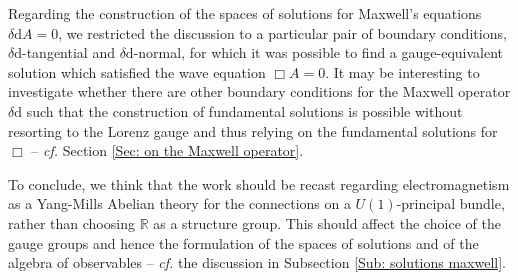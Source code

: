 Regarding the construction of the spaces of solutions for Maxwell's equations $\delta\mathrm{d}A=0$, we restricted the discussion to a particular pair of boundary conditions, $\delta\mathrm{d}$-tangential and $\delta\mathrm{d}$-normal, for which it was possible to find a gauge-equivalent solution which satisfied the wave equation $\Box A=0$.
It may be interesting to investigate whether there are other boundary conditions for the Maxwell operator $\delta\mathrm{d}$ such that the construction of fundamental solutions is possible without resorting to the Lorenz gauge and thus relying on the fundamental solutions for $\Box$ -- \emph{cf.} Section \ref{Sec: on the Maxwell operator}.\thispagestyle{plain}

To conclude, we think that the work should be recast regarding electromagnetism as a Yang-Mills Abelian theory for the connections on a $U(1)$-principal bundle, rather than choosing $\mathbb{R}$ as a structure group. This should affect the choice of the gauge groups and hence the formulation of the spaces of solutions and of the algebra of observables -- \emph{cf.} the discussion in Subsection \ref{Sub: solutions maxwell}.\thispagestyle{plain}










